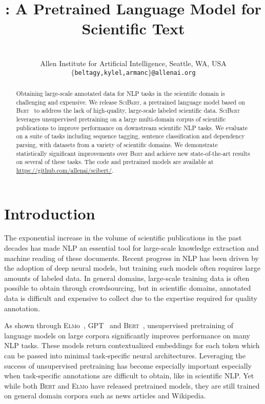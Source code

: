 \documentclass[11pt,a4paper]{article}
\title{\scibert: A Pretrained Language Model for Scientific Text}
\author{\makecell{Iz Beltagy~~~~~~~~Kyle Lo~~~~~~~~Arman Cohan} \\
Allen Institute for Artificial Intelligence, Seattle, WA, USA\\
{\tt $\{$beltagy,kylel,armanc$\}$@allenai.org}\\}
\date{}
\newcommand{\bert}{\textsc{Bert}\xspace}
\newcommand{\scibert}{\textsc{SciBert}\xspace}
\newcommand{\gpt}{\textsc{GPT}\xspace}
\newcommand{\elmo}{\textsc{Elm}o\xspace}
\begin{document}
\maketitle
\begin{abstract}
  Obtaining large-scale annotated data for NLP tasks in the scientific domain is challenging and expensive. 
We release \scibert,
a pretrained language model based on \bert~\cite{Devlin2018BERTPO} to address the lack of high-quality, large-scale labeled scientific data. \scibert leverages unsupervised pretraining on a large multi-domain corpus of scientific publications to improve performance on downstream scientific NLP tasks.
We evaluate on a suite of tasks including
sequence tagging, sentence classification and dependency parsing, 
with datasets from a variety of scientific domains. We demonstrate statistically significant improvements over \bert and achieve new state-of-the-art results on several of these tasks. The code and pretrained models are available at 
\url{https://github.com/allenai/scibert/}.
\end{abstract}

\section{Introduction}
The exponential increase in the volume of scientific publications in the past decades has made NLP an essential tool for large-scale knowledge extraction and machine reading of these documents. 
Recent progress in NLP has been driven by the adoption of deep neural models, but training such models often requires large amounts of labeled data. 
In general domains, large-scale training data is often possible to obtain through crowdsourcing, but in scientific domains, annotated data is difficult and expensive to collect due to the expertise required for quality annotation.


As shown through \elmo~\cite{Peters2018DeepCW}, \gpt~\cite{radford2018improving} and \bert~\cite{Devlin2018BERTPO},
unsupervised pretraining of language models on large corpora significantly improves performance on many NLP tasks.
These models return contextualized embeddings for each token which can be passed into minimal task-specific neural architectures.
Leveraging the success of unsupervised pretraining has become especially important especially when task-specific annotations are difficult to obtain, like in scientific NLP.  Yet while both \bert and \elmo have released pretrained models, they are still trained on general domain corpora such as news articles and Wikipedia.  
\end{document}
